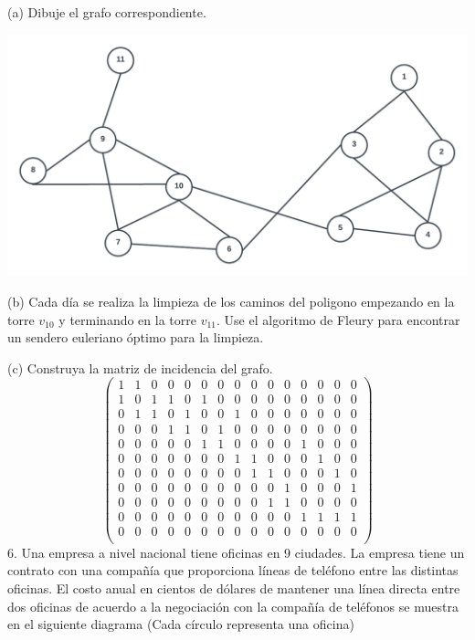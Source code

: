 \documentclass{report}
\begin{document}
(a) Dibuje el grafo correspondiente.

\includegraphics[width=1\textwidth]{images/graph1.png}

(b) Cada día se realiza la limpieza de los caminos del poligono empezando en la torre $v_{10}$ y terminando en la torre $v_{11}$. Use el algoritmo de Fleury para encontrar un sendero euleriano óptimo para la limpieza.

(c) Construya la matriz de incidencia del grafo.
\[
\left(\begin{array}{ccccccccccccccc}
1 & 1 & 0 & 0 & 0 & 0 & 0 & 0 & 0 & 0 & 0 & 0 & 0 & 0 & 0 \\
1 & 0 & 1 & 1 & 0 & 1 & 0 & 0 & 0 & 0 & 0 & 0 & 0 & 0 & 0 \\
0 & 1 & 1 & 0 & 1 & 0 & 0 & 1 & 0 & 0 & 0 & 0 & 0 & 0 & 0 \\
0 & 0 & 0 & 1 & 1 & 0 & 1 & 0 & 0 & 0 & 0 & 0 & 0 & 0 & 0 \\
0 & 0 & 0 & 0 & 0 & 1 & 1 & 0 & 0 & 0 & 0 & 1 & 0 & 0 & 0 \\
0 & 0 & 0 & 0 & 0 & 0 & 0 & 1 & 1 & 0 & 0 & 0 & 1 & 0 & 0 \\
0 & 0 & 0 & 0 & 0 & 0 & 0 & 0 & 1 & 1 & 0 & 0 & 0 & 1 & 0 \\
0 & 0 & 0 & 0 & 0 & 0 & 0 & 0 & 0 & 0 & 1 & 0 & 0 & 0 & 1 \\
0 & 0 & 0 & 0 & 0 & 0 & 0 & 0 & 0 & 1 & 1 & 0 & 0 & 0 & 0 \\
0 & 0 & 0 & 0 & 0 & 0 & 0 & 0 & 0 & 0 & 0 & 1 & 1 & 1 & 1 \\
0 & 0 & 0 & 0 & 0 & 0 & 0 & 0 & 0 & 0 & 0 & 0 & 0 & 0 & 0 \\
\end{array}\right)
\]
6. Una empresa a nivel nacional tiene oficinas en 9 ciudades. La empresa tiene un contrato con una compañía que proporciona líneas de teléfono entre las distintas oficinas. El costo anual en cientos de dólares de mantener una línea directa entre dos oficinas de acuerdo a la negociación con la compañía de teléfonos se muestra en el siguiente diagrama (Cada círculo representa una oficina)
\end{document}
